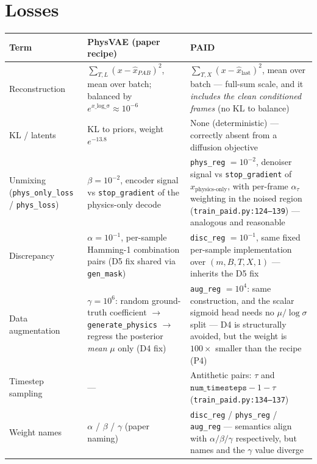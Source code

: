 \documentclass[11pt,a4paper]{article}
\newcommand{\code}[1]{\texttt{#1}}
\begin{document}
\section{Losses}

\begin{table}[h]
\centering
\small
\begin{tabularx}{\textwidth}{LXX}
\toprule
\textbf{Term} & \textbf{PhysVAE (paper recipe)} & \textbf{PAID} \\
\midrule
Reconstruction & $\sum_{T,L}(x - \hat{x}_{PAB})^2$, mean over batch; balanced by $e^{x\_\mathrm{log\_ \sigma}} \approx 10^{-6}$ & $\sum_{T,X}(x - \hat{x}_{\text{last}})^2$, mean over batch --- full-sum scale, and it \emph{includes the clean conditioned frames} (no KL to balance) \\
KL / latents & KL to priors, weight $e^{-13.8}$ & None (deterministic) --- correctly absent from a diffusion objective \\
Unmixing (\code{phys\_only\_loss} / \code{phys\_loss}) & $\beta = 10^{-2}$, encoder signal vs \code{stop\_gradient} of the physics-only decode & \code{phys\_reg} $= 10^{-2}$, denoiser signal vs \code{stop\_gradient} of $x_{\text{physics-only}}$, with per-frame $\alpha_\tau$ weighting in the noised region (\code{train\_paid.py:124--139}) --- analogous and reasonable \\
Discrepancy & $\alpha = 10^{-1}$, per-sample Hamming-1 combination pairs (D5 fix shared via \code{gen\_mask}) & \code{disc\_reg} $= 10^{-1}$, same fixed per-sample implementation over $(m, B, T, X, 1)$ --- inherits the D5 fix \\
Data augmentation & $\gamma = 10^{6}$: random ground-truth coefficient $\to$ \code{generate\_physics} $\to$ regress the posterior \emph{mean} $\mu$ only (D4 fix) & \code{aug\_reg} $= 10^{4}$: same construction, and the scalar sigmoid head needs no $\mu/\log\sigma$ split --- D4 is structurally avoided, but the weight is $100\times$ smaller than the recipe (P4) \\
Timestep sampling & --- & Antithetic pairs: $\tau$ and $\code{num\_timesteps} - 1 - \tau$ (\code{train\_paid.py:134--137}) \\
Weight names & $\alpha$ / $\beta$ / $\gamma$ (paper naming) & \code{disc\_reg} / \code{phys\_reg} / \code{aug\_reg} --- semantics align with $\alpha/\beta/\gamma$ respectively, but names and the $\gamma$ value diverge \\
\bottomrule
\end{tabularx}
\end{table}
\end{document}
